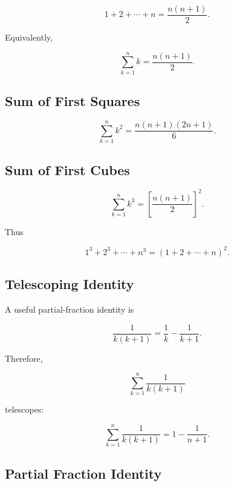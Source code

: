 \[
\boxed{
1+2+\cdots+n
=
\frac{n(n+1)}{2}.
}
\]

Equivalently,

\[
\boxed{
\sum_{k=1}^{n}k
=
\frac{n(n+1)}{2}.
}
\]

\subsection{Sum of First Squares}
\label{subsec:sum-first-squares}

\[
\boxed{
\sum_{k=1}^{n}k^2
=
\frac{
n(n+1)(2n+1)
}{6}.
}
\]

\subsection{Sum of First Cubes}
\label{subsec:sum-first-cubes}

\[
\boxed{
\sum_{k=1}^{n}k^3
=
\left[
\frac{n(n+1)}{2}
\right]^2.
}
\]

Thus

\[
\boxed{
1^3+2^3+\cdots+n^3
=
(1+2+\cdots+n)^2.
}
\]

\subsection{Telescoping Identity}
\label{subsec:telescoping-identity-reference}

A useful partial-fraction identity is

\[
\boxed{
\frac{1}{k(k+1)}
=
\frac1k
-
\frac1{k+1}.
}
\]

Therefore,

\[
\sum_{k=1}^{n}
\frac{1}{k(k+1)}
\]

telescopes:

\[
\boxed{
\sum_{k=1}^{n}
\frac{1}{k(k+1)}
=
1-\frac{1}{n+1}.
}
\]

\subsection{Partial Fraction Identity}
\label{subsec:basic-partial-fraction-identity}

